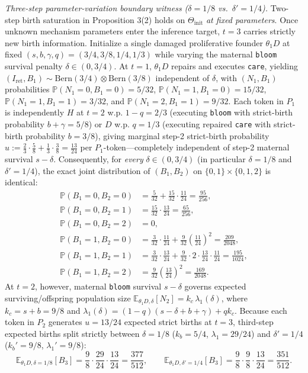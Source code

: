 \documentclass[11pt,letterpaper]{article}
\begin{document}
\emph{Three-step parameter-variation boundary witness (\(\delta = 1/8\)
vs.~\(\delta' = 1/4\)).} Two-step birth saturation in Proposition 3(2)
holds on \(\Theta_{\mathrm{init}}\) \emph{at fixed parameters}. Once
unknown mechanism parameters enter the inference target, \(t = 3\)
carries strictly new birth information. Initialize a single damaged
proliferative founder \(\theta_1 D\) at fixed
\((s, b, \gamma, q) = (3/4, 3/8, 1/4, 1/3)\) while varying the maternal
\texttt{bloom} survival penalty \(\delta \in (0, 3/4)\). At \(t=1\),
\(\theta_1 D\) repairs and executes \texttt{care}, yielding
\((I_{\mathrm{ret}}, B_1) \sim \mathrm{Bern}(3/4)\otimes\mathrm{Bern}(3/8)\)
independent of \(\delta\), with \((N_1, B_1)\) probabilities
\(\mathbb{P}(N_1=0, B_1=0) = 5/32\),
\(\mathbb{P}(N_1=1, B_1=0) = 15/32\),
\(\mathbb{P}(N_1=1, B_1=1) = 3/32\), and
\(\mathbb{P}(N_1=2, B_1=1) = 9/32\). Each token in \(P_1\) is
independently \(H\) at \(t=2\) w.p. \(1-q = 2/3\) (executing
\texttt{bloom} with strict-birth probability \(b+\gamma = 5/8\)) or
\(D\) w.p. \(q = 1/3\) (executing repaired \texttt{care} with
strict-birth probability \(b = 3/8\)), giving marginal step-2
strict-birth probability
\(u := \frac{2}{3}\cdot\frac{5}{8} + \frac{1}{3}\cdot\frac{3}{8} = \frac{13}{24}\)
per \(P_1\)-token---completely independent of step-2 maternal survival
\(s - \delta\). Consequently, for \emph{every} \(\delta \in (0, 3/4)\)
(in particular \(\delta = 1/8\) and \(\delta' = 1/4\)), the exact joint
distribution of \((B_1, B_2)\) on \(\{0,1\}\times\{0,1,2\}\) is
identical: \[\begin{aligned}
\mathbb{P}(B_1=0, B_2=0) &= \frac{5}{32} + \frac{15}{32}\cdot\frac{11}{24} = \frac{95}{256},\\
\mathbb{P}(B_1=0, B_2=1) &= \frac{15}{32}\cdot\frac{13}{24} = \frac{65}{256},\\
\mathbb{P}(B_1=0, B_2=2) &= 0,\\
\mathbb{P}(B_1=1, B_2=0) &= \frac{3}{32}\cdot\frac{11}{24} + \frac{9}{32}\left(\frac{11}{24}\right)^2 = \frac{209}{2048},\\
\mathbb{P}(B_1=1, B_2=1) &= \frac{3}{32}\cdot\frac{13}{24} + \frac{9}{32}\cdot 2\cdot\frac{13}{24}\cdot\frac{11}{24} = \frac{195}{1024},\\
\mathbb{P}(B_1=1, B_2=2) &= \frac{9}{32}\left(\frac{13}{24}\right)^2 = \frac{169}{2048}.
\end{aligned}\] At \(t=2\), however, maternal \texttt{bloom} survival
\(s - \delta\) governs expected surviving/offspring population size
\(\mathbb{E}_{\theta_1 D,\delta}[N_2] = k_c\,\lambda_1(\delta)\), where
\(k_c = s+b = 9/8\) and
\(\lambda_1(\delta) = (1-q)(s - \delta + b + \gamma) + q k_c\). Because
each token in \(P_2\) generates \(u = 13/24\) expected strict births at
\(t=3\), third-step expected births split strictly between
\(\delta = 1/8\) (\(k_b = 5/4\), \(\lambda_1 = 29/24\)) and
\(\delta' = 1/4\) (\(k_b' = 9/8\), \(\lambda_1' = 9/8\)):
\[\mathbb{E}_{\theta_1 D,\delta=1/8}[B_3] = \frac{9}{8}\cdot\frac{29}{24}\cdot\frac{13}{24} = \frac{377}{512},
\qquad
\mathbb{E}_{\theta_1 D,\delta'=1/4}[B_3] = \frac{9}{8}\cdot\frac{9}{8}\cdot\frac{13}{24} = \frac{351}{512}.\]
\end{document}
